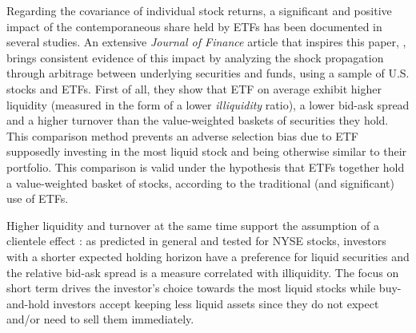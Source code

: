 Regarding the covariance of individual stock returns, a significant and positive impact of the contemporaneous share held by ETFs has been documented in several studies. An extensive \emph{Journal of Finance} article that inspires this paper, \cite{Ben-David2018}, brings consistent evidence of this impact by analyzing the shock propagation through arbitrage between underlying securities and funds, using a sample of U.S. stocks and ETFs. First of all, they show that ETF on average exhibit higher liquidity (measured in the form of a lower \cite{Amihud2002} \emph{illiquidity} ratio), a lower bid-ask spread and a higher turnover than the value-weighted baskets of securities they hold. This comparison method prevents an adverse selection bias due to ETF supposedly investing in the most liquid stock and being otherwise similar to their portfolio. This comparison is valid under the hypothesis that ETFs together hold a value-weighted basket of stocks, according to the traditional (and significant) use of ETFs.

Higher liquidity and turnover at the same time support the assumption of a clientele effect : as \cite{Amihud1986} predicted in general and tested for NYSE stocks, investors with a shorter expected holding horizon have a preference for liquid securities and the relative bid-ask spread is a measure correlated with illiquidity. The focus on short term drives the investor's choice towards the most liquid stocks while buy-and-hold investors accept keeping less liquid assets since they do not expect and/or need to sell them immediately. 

